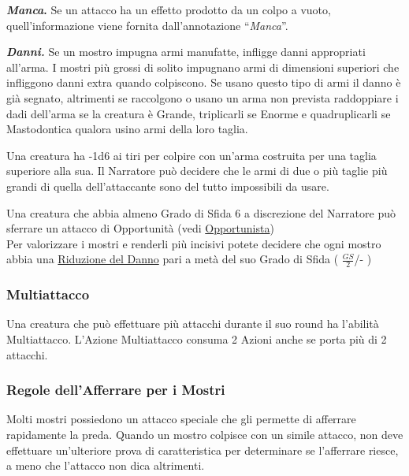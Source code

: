 \begin{multicols}{2}
\textbf{\textit{Manca}.} Se un attacco ha un effetto prodotto da un colpo a vuoto, quell'informazione viene fornita dall'annotazione ``\textit{Manca}''.

\textit{\textbf{Danni.}} Se un mostro impugna armi manufatte, infligge danni appropriati all'arma. I mostri più grossi di solito impugnano armi di dimensioni superiori che infliggono danni extra quando colpiscono. Se usano questo tipo di armi il danno è già segnato, altrimenti se raccolgono o usano un arma non prevista raddoppiare i dadi dell'arma se la creatura è Grande, triplicarli se Enorme e quadruplicarli se Mastodontica qualora usino armi della loro taglia.

Una creatura ha -1d6 ai tiri per colpire con un'arma costruita per una taglia superiore alla sua. Il Narratore può decidere che le armi di due o più taglie più grandi di quella dell'attaccante sono del tutto impossibili da usare.

\begin{changemargin}{0.3cm}{0.3cm}\begin{narratore}
Una creatura che abbia almeno Grado di Sfida 6 a discrezione del Narratore può sferrare un attacco di Opportunità (vedi \hyperlink{opportunista}{Opportunista})\\

Per valorizzare i mostri e renderli più incisivi potete decidere che ogni mostro abbia una  \hyperlink{riduzionedeldanno}{Riduzione del Danno} pari a metà del suo Grado di Sfida ( $\frac{GS}{2}$/- )

\end{narratore}\end{changemargin}

\subsubsection{Multiattacco}

Una creatura che può effettuare più attacchi durante il suo round ha l'abilità Multiattacco. L'Azione Multiattacco consuma 2 Azioni anche se porta più di 2 attacchi.

\subsubsection{Regole dell'Afferrare per i Mostri}

Molti mostri possiedono un attacco speciale che gli permette di afferrare rapidamente la preda. Quando un mostro colpisce con un simile attacco, non deve effettuare un'ulteriore prova di caratteristica per determinare se l'afferrare riesce, a meno che l'attacco non dica altrimenti.


\end{multicols}
